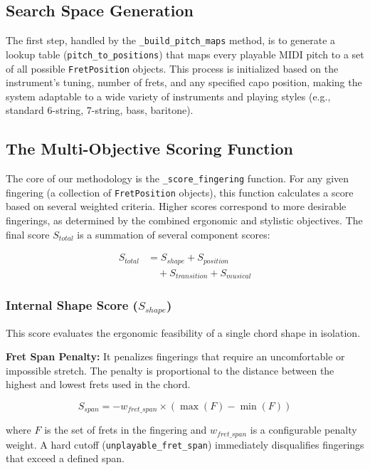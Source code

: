 \documentclass[conference]{IEEEtran}
\begin{document}
\subsection{Search Space Generation}

The first step, handled by the \texttt{\_build\_pitch\_maps} method, is to generate a lookup table (\texttt{pitch\_to\_positions}) that maps every playable MIDI pitch to a set of all possible \texttt{FretPosition} objects. This process is initialized based on the instrument's tuning, number of frets, and any specified capo position, making the system adaptable to a wide variety of instruments and playing styles (e.g., standard 6-string, 7-string, bass, baritone).

\subsection{The Multi-Objective Scoring Function}

The core of our methodology is the \texttt{\_score\_fingering} function. For any given fingering (a collection of \texttt{FretPosition} objects), this function calculates a score based on several weighted criteria. Higher scores correspond to more desirable fingerings, as determined by the combined ergonomic and stylistic objectives. The final score $S_{total}$ is a summation of several component scores:

\begin{align}
S_{total} &= S_{shape} + S_{position} \nonumber\\
          &\quad + S_{transition} + S_{musical}
\end{align}


\subsubsection{Internal Shape Score ($S_{shape}$)}
This score evaluates the ergonomic feasibility of a single chord shape in isolation.

\textbf{Fret Span Penalty:} It penalizes fingerings that require an uncomfortable or impossible stretch. The penalty is proportional to the distance between the highest and lowest frets used in the chord.

\begin{equation}
S_{span} = -w_{fret\_span} \times (\max(F) - \min(F))
\end{equation}

where $F$ is the set of frets in the fingering and $w_{fret\_span}$ is a configurable penalty weight. A hard cutoff (\texttt{unplayable\_fret\_span}) immediately disqualifies fingerings that exceed a defined span.
\end{document}
